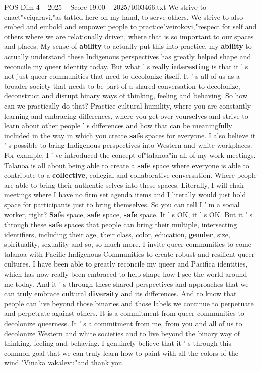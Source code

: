 \begin{textsample}{POS Dim 4 – 2025 – Score 19.00 – 2025/t003466.txt}
We strive to enact"veiqaravi,"as tatted here on my hand, to serve others.
We strive to also embed and embold and empower people to practice"veirokovi,"respect for self and others where we are relationally driven, where that is so important to our spaces and places.
My sense of \textbf{ability} to actually put this into practice, my \textbf{ability} to actually understand these Indigenous perspectives has greatly helped shape and reconcile my queer identity today.
But what ' s really \textbf{interesting} is that it ' s not just queer communities that need to decolonize itself.
It ' s all of us as a broader society that needs to be part of a shared conversation to decolonize, deconstruct and disrupt binary ways of thinking, feeling and behaving.
So how can we practically do that?
Practice cultural humility, where you are constantly learning and embracing differences, where you get over yourselves and strive to learn about other people ' s differences and how that can be meaningfully included in the way in which you create \textbf{safe} spaces for everyone.
I also believe it ' s possible to bring Indigenous perspectives into Western and white workplaces.
For example, I ' ve introduced the concept of"talanoa"in all of my work meetings.
Talanoa is all about being able to create a \textbf{safe} space where everyone is able to contribute to a \textbf{collective}, collegial and collaborative conversation.
Where people are able to bring their authentic selves into these spaces.
Literally, I will chair meetings where I have no firm set agenda items and I literally would just hold space for participants just to bring themselves.
So you can tell I ' m a social worker, right? \textbf{Safe} space, \textbf{safe} space, \textbf{safe} space.
It ' s OK, it ' s OK.
But it ' s through these \textbf{safe} spaces that people can bring their multiple, intersecting identifiers, including their age, their class, color, education, \textbf{gender}, size, spirituality, sexuality and so, so much more.
I invite queer communities to come talanoa with Pacific Indigenous Communities to create robust and resilient queer cultures.
I have been able to greatly reconcile my queer and Pacifica identities, which has now really been embraced to help shape how I see the world around me today.
And it ' s through these shared perspectives and approaches that we can truly embrace cultural \textbf{diversity} and its differences.
And to know that people can live beyond those binaries and those labels we continue to perpetuate and perpetrate against others.
It is a commitment from queer communities to decolonize queerness.
It ' s a commitment from me, from you and all of us to decolonize Western and white societies and to live beyond the binary way of thinking, feeling and behaving.
I genuinely believe that it ' s through this common goal that we can truly learn how to paint with all the colors of the wind."Vinaka vakalevu"and thank you.

\end{textsample}
